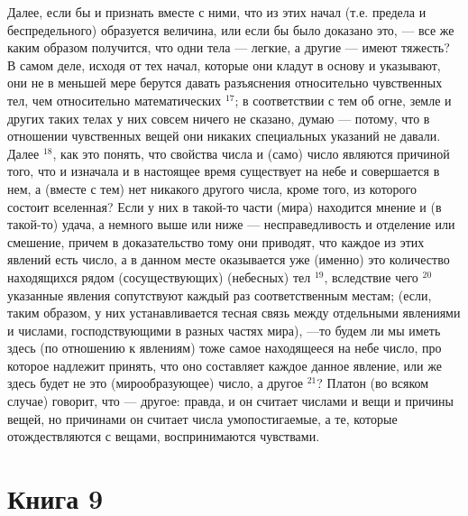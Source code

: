 \documentclass[oneside, 17pt, dvipsnames]{extbook}
\begin{document}
Далее, если бы и признать вместе с ними, что из этих начал (т.е. предела и беспредельного) образуется величина, или если бы было доказано это, — все же каким образом получится, что одни тела — легкие, а другие — имеют тяжесть? В самом деле, исходя от тех начал, которые они кладут в основу и указывают, они не в меньшей мере берутся давать разъяснения относительно чувственных тел, чем относительно математических $^{17}$; в соответствии с тем об огне, земле и других таких телах у них совсем ничего не сказано, думаю — потому, что в отношении чувственных вещей они никаких специальных указаний не давали. Далее $^{18}$, как это понять, что свойства числа и (само) число являются причиной того, что и изначала и в настоящее время существует на небе и совершается в нем, а (вместе с тем) нет никакого другого числа, кроме того, из которого состоит вселенная? Если у них в такой-то части (мира) находится мнение и (в такой-то) удача, а немного выше или ниже — несправедливость и отделение или смешение, причем в доказательство тому они приводят, что каждое из этих явлений есть число, а в данном месте оказывается уже (именно) это количество находящихся рядом (сосуществующих) (небесных) тел $^{19}$, вследствие чего $^{20}$ указанные явления сопутствуют каждый раз соответственным местам; (если, таким образом, у них устанавливается тесная связь между отдельными явлениями и числами, господствующими в разных частях мира), —то будем ли мы иметь здесь (по отношению к явлениям) тоже самое находящееся на небе число, про которое надлежит принять, что оно составляет каждое данное явление, или же здесь будет не это (мирообразующее) число, а другое $^{21}$? Платон (во всяком случае) говорит, что — другое: правда, и он считает числами и вещи и причины вещей, но причинами он считает числа умопостигаемые, а те, которые отождествляются с вещами, воспринимаются чувствами.

\vfill




\newpage
\section{Книга 9}
\end{document}
